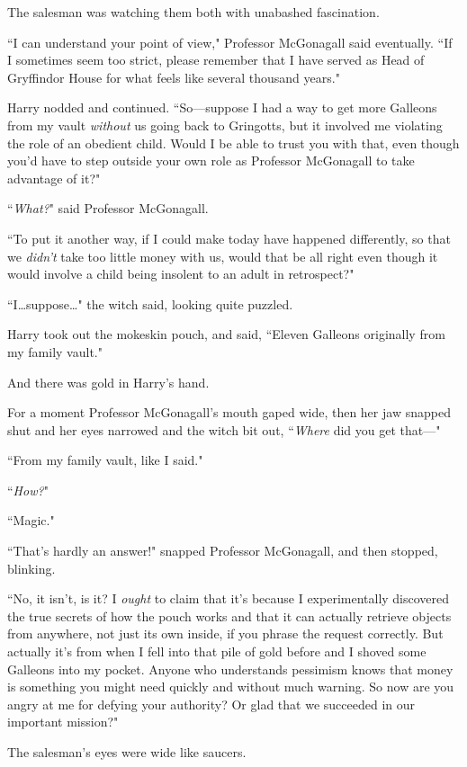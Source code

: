 The salesman was watching them both with unabashed fascination.

``I can understand your point of view," Professor McGonagall said eventually. ``If I sometimes seem too strict, please remember that I have served as Head of Gryffindor House for what feels like several thousand years."

Harry nodded and continued. ``So—suppose I had a way to get more Galleons from my vault \emph{without} us going back to Gringotts, but it involved me violating the role of an obedient child. Would I be able to trust you with that, even though you'd have to step outside your own role as Professor McGonagall to take advantage of it?"

``\emph{What?}" said Professor McGonagall.

``To put it another way, if I could make today have happened differently, so that we \emph{didn't} take too little money with us, would that be all right even though it would involve a child being insolent to an adult in retrospect?"

``I…suppose…" the witch said, looking quite puzzled.

Harry took out the mokeskin pouch, and said, ``Eleven Galleons originally from my family vault."

And there was gold in Harry's hand.

For a moment Professor McGonagall's mouth gaped wide, then her jaw snapped shut and her eyes narrowed and the witch bit out, ``\emph{Where} did you get that—"

``From my family vault, like I said."

``\emph{How?}"

``Magic."

``That's hardly an answer!" snapped Professor McGonagall, and then stopped, blinking.

``No, it isn't, is it? I \emph{ought} to claim that it's because I experimentally discovered the true secrets of how the pouch works and that it can actually retrieve objects from anywhere, not just its own inside, if you phrase the request correctly. But actually it's from when I fell into that pile of gold before and I shoved some Galleons into my pocket. Anyone who understands pessimism knows that money is something you might need quickly and without much warning. So now are you angry at me for defying your authority? Or glad that we succeeded in our important mission?"

The salesman's eyes were wide like saucers.

